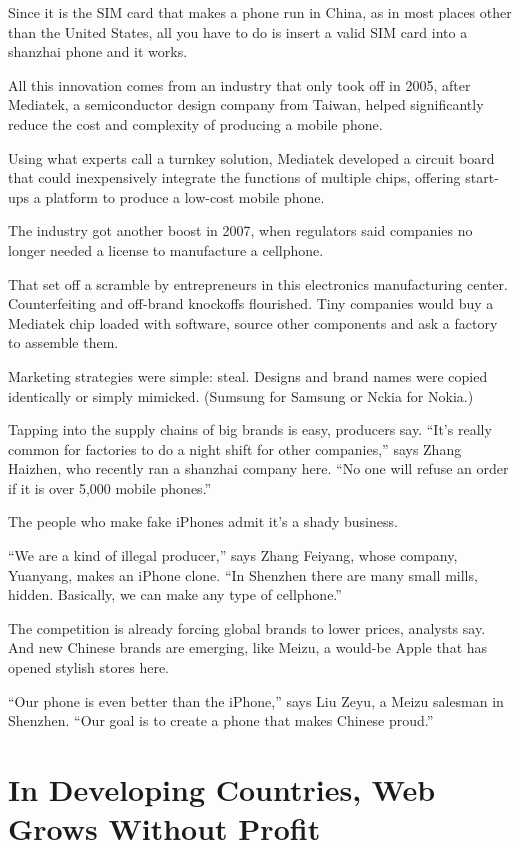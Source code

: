 \documentclass[12pt,a4paper,onecolumn]{article}
\begin{document}
Since it is the SIM card that makes a phone run in China, as in most places other than the United
States, all you have to do is insert a valid SIM card into a shanzhai phone and it works.

All this innovation comes from an industry that only took off in 2005, after Mediatek, a
semiconductor design company from Taiwan, helped significantly reduce the cost and complexity of
producing a mobile phone.

Using what experts call a turnkey solution, Mediatek developed a circuit board that could
inexpensively integrate the functions of multiple chips, offering start-ups a platform to produce a
low-cost mobile phone.

The industry got another boost in 2007, when regulators said companies no longer needed a license to
manufacture a cellphone.

That set off a scramble by entrepreneurs in this electronics manufacturing center. Counterfeiting
and off-brand knockoffs flourished. Tiny companies would buy a Mediatek chip loaded with software,
source other components and ask a factory to assemble them.

Marketing strategies were simple: steal. Designs and brand names were copied identically or simply
mimicked. (Sumsung for Samsung or Nckia for Nokia.)

Tapping into the supply chains of big brands is easy, producers say. ``It's really common for
factories to do a night shift for other companies,'' says Zhang Haizhen, who recently ran a shanzhai
company here. ``No one will refuse an order if it is over 5,000 mobile phones.''

The people who make fake iPhones admit it's a shady business.

``We are a kind of illegal producer,'' says Zhang Feiyang, whose company, Yuanyang, makes an iPhone
clone. ``In Shenzhen there are many small mills, hidden. Basically, we can make any type of
cellphone.''

The competition is already forcing global brands to lower prices, analysts say. And new Chinese
brands are emerging, like Meizu, a would-be Apple that has opened stylish stores here.

``Our phone is even better than the iPhone,'' says Liu Zeyu, a Meizu salesman in Shenzhen. ``Our
goal is to create a phone that makes Chinese proud.''

\section{In Developing Countries, Web Grows Without Profit}
\end{document}

